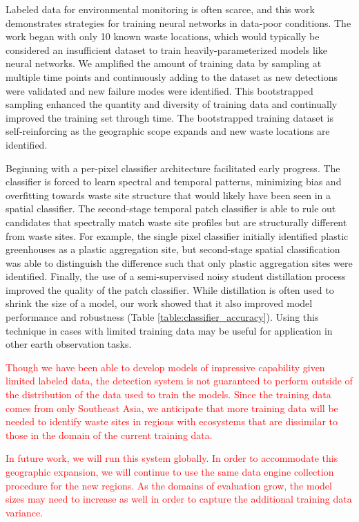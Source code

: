 \documentclass[10pt,letterpaper]{article}
\begin{document}
Labeled data for environmental monitoring is often scarce, and this work demonstrates strategies for training neural networks in data-poor conditions. The work began with only 10 known waste locations, which would typically be considered an insufficient dataset to train heavily-parameterized models like neural networks. We amplified the amount of training data by sampling at multiple time points and continuously adding to the dataset as new detections were validated and new failure modes were identified. This bootstrapped sampling enhanced the quantity and diversity of training data and continually improved the training set through time. The bootstrapped training dataset is self-reinforcing as the geographic scope expands and new waste locations are identified.

Beginning with a per-pixel classifier architecture facilitated early progress. The classifier is forced to learn spectral and temporal patterns, minimizing bias and overfitting towards waste site structure that would likely have been seen in a spatial classifier. The second-stage temporal patch classifier is able to rule out candidates that spectrally match waste site profiles but are structurally different from waste sites. For example, the single pixel classifier initially identified plastic greenhouses as a plastic aggregation site, but second-stage spatial classification was able to distinguish the difference such that only plastic aggregation sites were identified. Finally, the use of a semi-supervised noisy student distillation process improved the quality of the patch classifier. While distillation is often used to shrink the size of a model, our work showed that it also improved model performance and robustness (Table \ref{table:classifier_accuracy}). Using this technique in cases with limited training data may be useful for application in other earth observation tasks.

\textcolor{red}{Though we have been able to develop models of impressive capability given limited labeled data, the detection system is not guaranteed to perform outside of the distribution of the data used to train the models. Since the training data comes from only Southeast Asia, we anticipate that more training data will be needed to identify waste sites in regions with ecosystems that are dissimilar to those in the domain of the current training data.}

\textcolor{red}{In future work, we will run this system globally. In order to accommodate this geographic expansion, we will continue to use the same data engine collection procedure for the new regions. As the domains of evaluation grow, the model sizes may need to increase as well in order to capture the additional training data variance.}
\end{document}
